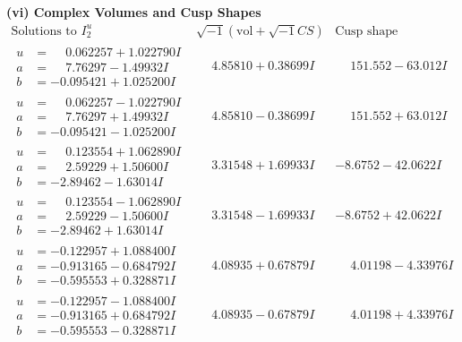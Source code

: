 \documentclass[1p]{elsarticle_modified}
\theoremstyle{definition}
\newcommand{\I}{\sqrt{-1}}
\begin{document}
\newpage\flushleft \textbf{(vi) Complex Volumes and Cusp Shapes}
$$\begin{array}{c|c|c}  
\text{Solutions to }I^u_{2}& \I (\text{vol} + \sqrt{-1}CS) & \text{Cusp shape}\\
 \hline 
\begin{aligned}
u &= \phantom{-}0.062257 + 1.022790 I \\
a &= \phantom{-}7.76297 - 1.49932 I \\
b &= -0.095421 + 1.025200 I\end{aligned}
 & \phantom{-}4.85810 + 0.38699 I & \phantom{-}151.552 - 63.012 I \\ \hline\begin{aligned}
u &= \phantom{-}0.062257 - 1.022790 I \\
a &= \phantom{-}7.76297 + 1.49932 I \\
b &= -0.095421 - 1.025200 I\end{aligned}
 & \phantom{-}4.85810 - 0.38699 I & \phantom{-}151.552 + 63.012 I \\ \hline\begin{aligned}
u &= \phantom{-}0.123554 + 1.062890 I \\
a &= \phantom{-}2.59229 + 1.50600 I \\
b &= -2.89462 - 1.63014 I\end{aligned}
 & \phantom{-}3.31548 + 1.69933 I & -8.6752 - 42.0622 I \\ \hline\begin{aligned}
u &= \phantom{-}0.123554 - 1.062890 I \\
a &= \phantom{-}2.59229 - 1.50600 I \\
b &= -2.89462 + 1.63014 I\end{aligned}
 & \phantom{-}3.31548 - 1.69933 I & -8.6752 + 42.0622 I \\ \hline\begin{aligned}
u &= -0.122957 + 1.088400 I \\
a &= -0.913165 - 0.684792 I \\
b &= -0.595553 + 0.328871 I\end{aligned}
 & \phantom{-}4.08935 + 0.67879 I & \phantom{-}4.01198 - 4.33976 I \\ \hline\begin{aligned}
u &= -0.122957 - 1.088400 I \\
a &= -0.913165 + 0.684792 I \\
b &= -0.595553 - 0.328871 I\end{aligned}
 & \phantom{-}4.08935 - 0.67879 I & \phantom{-}4.01198 + 4.33976 I \\ \hline\begin{aligned}

\end{aligned}
\end{array}$$
\end{document}

